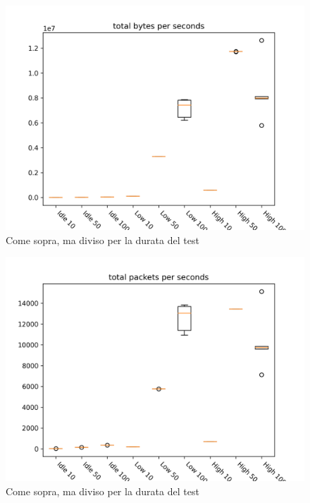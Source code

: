 \documentclass[target=bach]{thud}
\begin{document}
\begin{figure}[H]
    \includegraphics[width=\linewidth, height=0.4\textheight, keepaspectratio]{graphs/total bytes per seconds.png}
    \caption{Come sopra, ma diviso per la durata del test}
    \label{fig:tbps}
\end{figure}

\begin{figure}[H]
    \includegraphics[width=\linewidth, height=0.4\textheight, keepaspectratio]{graphs/total packets per seconds.png}
    \caption{Come sopra, ma diviso per la durata del test}
    \label{fig:tpps}
\end{figure}
\end{document}
